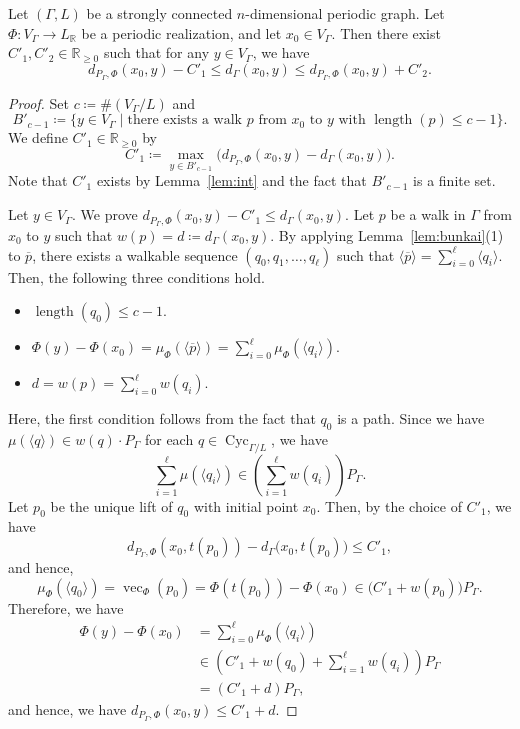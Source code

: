 \documentclass[ALCO,published]{cedram}
\theoremstyle{remark}
\begin{document}
\begin{thm}\label{thm:asymp}
Let $(\Gamma , L)$ be a strongly connected $n$-dimensional periodic graph. 
Let $\Phi\colon V_{\Gamma} \to L_{\mathbb{R}}$ be a periodic realization, 
and let $x_0 \in V_{\Gamma}$. Then there exist $C' _1, C' _2 \in \mathbb{R}_{\ge 0}$ such that 
for any $y \in V _{\Gamma}$, we have 
\[
d_{P_{\Gamma}, \Phi} (x_0, y) - C' _1 \le d_{\Gamma}(x_0, y) \le d_{P_{\Gamma}, \Phi} (x_0,y) + C' _2. 
\]
\end{thm}
\begin{proof}
Set $c \coloneqq  \# (V_{\Gamma} /L)$ and 
\[
B'_{c-1} \coloneqq  \{ y \in V_{\Gamma} \mid \text{there exists a walk $p$ from $x_0$ to $y$ with $\operatorname{length}(p) \le c-1$}\}. 
\]
We define $C' _1 \in \mathbb{R}_{\ge 0}$ by
\[
C' _1 \coloneqq  \max _{y \in B'_{c-1}} \bigl( d_{P_{\Gamma}, \Phi}(x_0, y) - d_{\Gamma}(x_0, y)  \bigr). 
\]
Note that $C' _1$ exists by Lemma~\ref{lem:int} and the fact that $B'_{c-1}$ is a finite set. 

Let $y \in V_{\Gamma}$. 
We prove $d_{P_{\Gamma}, \Phi}(x_0, y) - C' _1 \le d_{\Gamma}(x_0, y)$. 
Let $p$ be a walk in $\Gamma$ from $x_0$ to $y$ such that $w(p) = d \coloneqq  d_{\Gamma}(x_0, y)$. 
By applying Lemma~\ref{lem:bunkai}(1) to $\overline{p}$, 
there exists a walkable sequence $(q_0, q_1, \ldots , q_{\ell})$ 
such that $\langle \overline{p} \rangle = \sum _{i=0} ^{\ell} \langle q_i \rangle$. 
Then, the following three conditions hold. 
\begin{itemize}
\item 
$\operatorname{length}(q_0) \le c-1$. 

\item 
$\Phi(y) - \Phi(x_0) = \mu _{\Phi} (\langle \overline{p} \rangle) = 
\sum _{i=0}^{\ell} \mu _{\Phi} (\langle q_i \rangle)$. 

\item 
$d = w(p) = 
\sum _{i=0}^{\ell} w(q_i)$. 
\end{itemize}
Here, the first condition follows from the fact that $q_0$ is a path. 
Since we have $\mu (\langle q \rangle) \in w(q) \cdot P_{\Gamma}$ for each $q \in \operatorname{Cyc}_{\Gamma /L}$, 
we have 
\[
\sum _{i=1}^{\ell} \mu (\langle q_i \rangle) \in 
\left( \sum _{i=1}^{\ell} w(q_i) \right) P_{\Gamma}. 
\]
Let $p_0$ be the unique lift of $q_0$ with initial point $x_0$. 
Then, by the choice of $C' _1$, we have 
\[
d_{P_{\Gamma}, \Phi} (x_0, t(p_0)) - d_\Gamma \bigl(x_0,t(p_0) \bigr) \leq C' _1,
\]
and hence, 
\[
\mu _{\Phi} (\langle q_0 \rangle) = \operatorname{vec} _{\Phi} (p_0) = \Phi(t(p_0)) - \Phi(x_0) 
\in \bigl( C' _1 + w(p_0) \bigr) P_{\Gamma}. 
\]
Therefore, we have
\begin{align*}
\Phi(y) - \Phi(x_0) 
&= \sum _{i=0} ^{\ell} \mu _{\Phi} (\langle q_i \rangle) \\
& \in \left( C' _1 + w(q_0) +
\sum _{i=1} ^{\ell} w(q_i) \right) P_{\Gamma}\\
& = (C' _1 + d)P_{\Gamma}, 
\end{align*}
and hence, we have $d_{P_{\Gamma}, \Phi}(x_0, y) \le C' _1 + d$. 


\end{proof}
\end{document}
